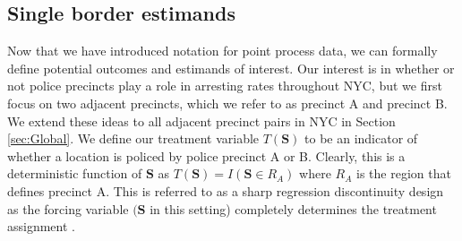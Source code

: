 \documentclass[a4paper,11pt]{article}
\begin{document}
\subsection{Single border estimands}

Now that we have introduced notation for point process data, we can formally define potential outcomes and estimands of interest. Our interest is in whether or not police precincts play a role in arresting rates throughout NYC, but we first focus on two adjacent precincts, which we refer to as precinct A and precinct B. We extend these ideas to all adjacent precinct pairs in NYC in Section \ref{sec:Global}. We define our treatment variable $T(\boldsymbol{S})$ to be an indicator of whether a location is policed by police precinct A or B. Clearly, this is a deterministic function of $\boldsymbol{S}$ as $T(\boldsymbol{S}) = I(\boldsymbol{S} \in R_A)$ where $R_A$ is the region that defines precinct A. This is referred to as a sharp regression discontinuity design as the forcing variable $(\boldsymbol{S}$ in this setting) completely determines the treatment assignment \citep{trochim1990regression}. 
\end{document}
